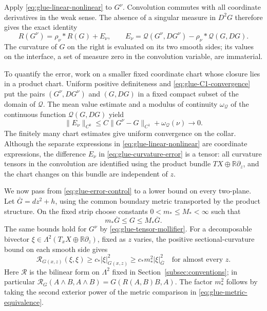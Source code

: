 \documentclass[12pt]{amsart}
\numberwithin{equation}{section}
\theoremstyle{remark}
\newcommand{\Rr}{\mathbb R}
\begin{document}
Apply \eqref{eq:glue-linear-nonlinear} to \(G^\nu\).
Convolution commutes with all coordinate derivatives in the
weak sense. The absence of a singular measure in \(D^2G\)
therefore gives the exact identity
\begin{equation}\label{eq:glue-curvature-error}
 R(G^\nu)=\rho_\nu*R(G)+E_\nu,
 \qquad
 E_\nu=\mathcal Q(G^\nu,DG^\nu)
                  -\rho_\nu*\mathcal Q(G,DG).
\end{equation}
The curvature of \(G\) on the right is evaluated on its two
smooth sides; its values on the interface, a set of measure
zero in the convolution variable, are immaterial.

To quantify the error, work on a smaller fixed coordinate
chart whose closure lies in a product chart. Uniform positive
definiteness and \eqref{eq:glue-C1-convergence} put the pairs
\((G^\nu,DG^\nu)\) and \((G,DG)\) in a fixed compact subset
of the domain of \(\mathcal Q\). The mean value estimate and
a modulus of continuity \(\omega_{\mathcal Q}\) of the
continuous function \(\mathcal Q(G,DG)\) yield
\begin{equation}\label{eq:glue-error-control}
 \|E_\nu\|_{C^0}
 \le C\|G^\nu-G\|_{C^1}+\omega_{\mathcal Q}(\nu)
 \longrightarrow0.
\end{equation}
The finitely many chart estimates give uniform convergence on
the collar. Although the separate expressions in
\eqref{eq:glue-linear-nonlinear} are coordinate expressions,
the difference \(E_\nu\) in
\eqref{eq:glue-curvature-error} is a tensor: all curvature
tensors in the convolution are identified using the product
bundle \(TX\oplus\Rr\partial_z\), and the chart changes on
this bundle are independent of \(z\).

We now pass from \eqref{eq:glue-error-control} to a lower bound
on every two-plane. Let
\(\overline G=dz^2+h\), using the common boundary metric
transported by the product structure. On the fixed strip choose
constants \(0<m_*\le M_*<\infty\) such that
\begin{equation}\label{eq:glue-metric-equivalence}
 m_*\overline G\le G\le M_*\overline G.
\end{equation}
The same bounds hold for \(G^\nu\) by
\eqref{eq:glue-tensor-mollifier}. For a decomposable bivector
\(\xi\in\Lambda^2(T_xX\oplus\Rr\partial_z)\), fixed as
\(z\) varies, the positive sectional-curvature bound on each
smooth side gives
\begin{equation}\label{eq:glue-ae-positive}
 \mathcal R_{G(x,z)}(\xi,\xi)
 \ge c_*|\xi|_{G(x,z)}^2
 \ge c_*m_*^2|\xi|_{\overline G}^2
 \quad\text{for almost every }z.
\end{equation}
Here \(\mathcal R\) is the bilinear form on \(\Lambda^2\)
fixed in Section~\ref{subsec:conventions}; in particular
\(\mathcal R_G(A\wedge B,A\wedge B)=G(R(A,B)B,A)\).
The factor \(m_*^2\) follows by taking the second exterior
power of the metric comparison in
\eqref{eq:glue-metric-equivalence}.
\end{document}
